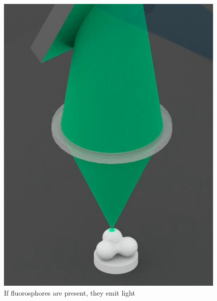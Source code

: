 \documentclass[t]{beamer}
\begin{document}
\begin{frame}
\begin{figure}
{     \includegraphics[scale=0.1]{CM-process-2-2}
     \caption{\footnotemark{}If fluorosphores are present, they emit light}
     }
\end{figure}
\end{frame}
\end{document}
